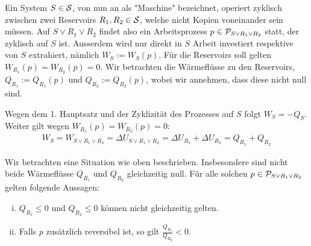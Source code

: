 \begin{minipage}{0.39\textwidth}
    Ein System $S \in \S$, von nun an als "Maschine" bezeichnet, operiert
    zyklisch zwischen zwei Reservoirs $R_1,R_2 \in \S$, welche nicht
    Kopien voneinander sein müssen. Auf $S \vee R_1 \vee R_2$ findet also
    ein Arbeitsprozess $p \in \P_{S \vee R_1 \vee R_2}$ statt, der zyklisch
    auf $S$ ist. Ausserdem wird nur direkt in $S$ Arbeit investiert respektive
    von $S$ extrahiert, nämlich $W_S := W_S (p)$. Für die Reservoirs soll
    gelten $W_{R_1}(p) = W_{R_2}(p) = 0$. Wir betrachten die Wärmeflüsse zu
    den Reservoirs, $Q_{R_1} := Q_{R_1}(p)$ und $Q_{R_2} := Q_{R_2}(p)$, wobei
    wir annehmen, dass diese nicht null sind.
\end{minipage}

\begin{bemerkung}
    Wegen dem 1. Hauptsatz und der Zyklizität des Prozesses auf $S$ folgt
    $W_S = - Q_S$. Weiter gilt wegen $W_{R_1}(p) = W_{R_2}(p) = 0$:
    \begin{align*}
        W_S = W_{S \vee R_1 \vee R_2} = \Delta U_{S \vee R_1 \vee R_2}
    = \Delta U_{R_1} + \Delta U_{R_2} = Q_{R_1} + Q_{R_2}
    \end{align*}
\end{bemerkung}

\begin{lemma}
    Wir betrachten eine Situation wie oben beschrieben. Insbesondere sind
    nicht beide Wärmeflüsse $Q_{R_1}$ und $Q_{R_2}$ gleichzeitig null. Für
    alle solchen $p \in \P_{S \vee R_1 \vee R_2}$ gelten folgende Aussagen:
    \begin{enumerate}[(i)]
        \item $Q_{R_1} \leq 0$ und $Q_{R_2} \leq 0$ können nicht gleichzeitig gelten.
        \item Falls $p$ zusätzlich reversibel ist, so gilt $\frac{Q_{R_1}}{Q_{R_2}} < 0$.
    \end{enumerate}
\end{lemma}

